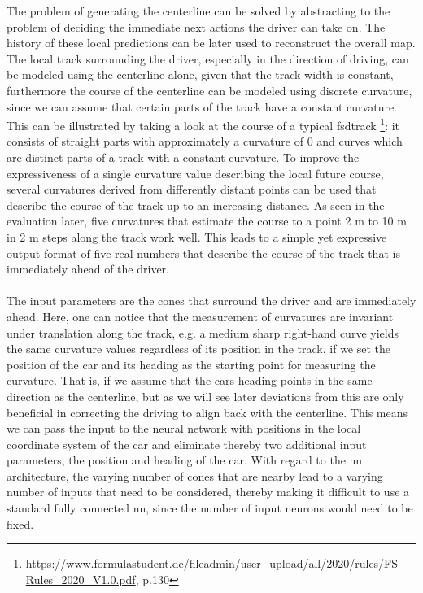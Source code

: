 The problem of generating the centerline can be solved by abstracting to the problem of deciding the immediate next actions the driver can take on. The history of these local predictions can be later used to reconstruct the overall map. The local track surrounding the driver, especially in the direction of driving, can be modeled using the centerline alone, given that the track width is constant, furthermore the course of the centerline can be modeled using discrete curvature, since we can assume that certain parts of the track have a constant curvature. This can be illustrated by taking a look at the course of a typical \ac{fsd}track \footnote{\url{https://www.formulastudent.de/fileadmin/user_upload/all/2020/rules/FS-Rules_2020_V1.0.pdf}, p.130}: it consists of straight parts with approximately a curvature of 0 and curves which are distinct parts of a track with a constant curvature. To improve the expressiveness of a single curvature value describing the local future course, several curvatures derived from differently distant points can be used that describe the course of the track up to an increasing distance. As seen in the evaluation later, five curvatures that estimate the course to a point 2 m to 10 m in 2 m steps along the track work well. This leads to a simple yet expressive output format of five real numbers that describe the course of the track that is immediately ahead of the driver. \\\\The input parameters are the cones that surround the driver and are immediately ahead. Here, one can notice that the measurement of curvatures are invariant under translation along the track, e.g. a medium sharp right-hand curve yields the same curvature values regardless of its position in the track, if we set the position of the car and its heading as the starting point for measuring the curvature. That is, if we assume that the cars heading points in the same direction as the centerline, but as we will see later deviations from this are only beneficial in correcting the driving to align back with the centerline. This means we can pass the input to the neural network with positions in the local coordinate system of the car and eliminate thereby two additional input parameters, the position and heading of the car. With regard to the \ac{nn} architecture, the varying number of cones that are nearby lead to a varying number of inputs that need to be considered, thereby making it difficult to use a standard fully connected \ac{nn}, since the number of input neurons would need to be fixed.
